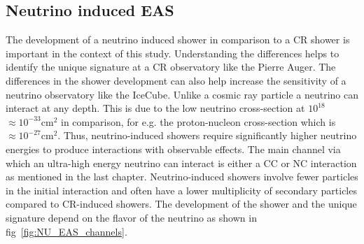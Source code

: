 \subsection{Neutrino induced EAS}
\label{sec:Dev_Nu}
The development of a neutrino induced shower in comparison to a CR shower is important in the context of this study. Understanding the differences helps to identify the unique signature at a CR observatory like the Pierre Auger. The differences in the shower development can also help increase the sensitivity of a neutrino observatory like the IceCube. Unlike a cosmic ray particle a neutrino can interact at any depth. This is due to the low neutrino cross-section at $10^{18}$ $\approx 10^{-33} \mathrm{cm^2}$  in comparison, for e.g. the proton-nucleon cross-section which is $\approx 10^{-27} \mathrm{cm^2}$. Thus, neutrino-induced showers require significantly higher neutrino energies to produce interactions with observable effects. The main channel via which an ultra-high energy neutrino can interact is either a CC or NC interaction as mentioned in the last chapter. Neutrino-induced showers involve fewer particles in the initial interaction and often have a lower multiplicity of secondary particles compared to CR-induced showers. The development of the shower and the unique signature depend on the flavor of the neutrino as shown in fig~\ref{fig:NU_EAS_channels}.
